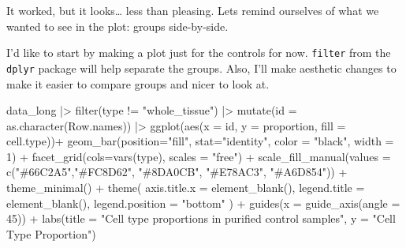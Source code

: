 \documentclass[
  letterpaper,
  DIV=11,
  numbers=noendperiod]{scrreprt}
\newenvironment{Shaded}{\begin{snugshade}}{\end{snugshade}}
\newcommand{\AttributeTok}[1]{\textcolor[rgb]{0.40,0.45,0.13}{#1}}
\newcommand{\DecValTok}[1]{\textcolor[rgb]{0.68,0.00,0.00}{#1}}
\newcommand{\FunctionTok}[1]{\textcolor[rgb]{0.28,0.35,0.67}{#1}}
\newcommand{\NormalTok}[1]{\textcolor[rgb]{0.00,0.23,0.31}{#1}}
\newcommand{\SpecialCharTok}[1]{\textcolor[rgb]{0.37,0.37,0.37}{#1}}
\newcommand{\StringTok}[1]{\textcolor[rgb]{0.13,0.47,0.30}{#1}}
\begin{document}
It worked, but it looks\ldots{} less than pleasing. Lets remind
ourselves of what we wanted to see in the plot: groups side-by-side.

I'd like to start by making a plot just for the controls for now.
\texttt{filter} from the \texttt{dplyr} package will help separate the
groups. Also, I'll make aesthetic changes to make it easier to compare
groups and nicer to look at.

\begin{Shaded}
\begin{Highlighting}[]
\NormalTok{data\_long }\SpecialCharTok{|\textgreater{}} 
  \FunctionTok{filter}\NormalTok{(type }\SpecialCharTok{!=} \StringTok{"whole\_tissue"}\NormalTok{) }\SpecialCharTok{|\textgreater{}} 
  \FunctionTok{mutate}\NormalTok{(}\AttributeTok{id =} \FunctionTok{as.character}\NormalTok{(Row.names)) }\SpecialCharTok{|\textgreater{}} 
  \FunctionTok{ggplot}\NormalTok{(}\FunctionTok{aes}\NormalTok{(}\AttributeTok{x =}\NormalTok{ id, }\AttributeTok{y =}\NormalTok{ proportion, }\AttributeTok{fill =}\NormalTok{ cell.type))}\SpecialCharTok{+}
  \FunctionTok{geom\_bar}\NormalTok{(}\AttributeTok{position=}\StringTok{"fill"}\NormalTok{, }\AttributeTok{stat=}\StringTok{"identity"}\NormalTok{, }\AttributeTok{color =} \StringTok{"black"}\NormalTok{, }\AttributeTok{width =} \DecValTok{1}\NormalTok{) }\SpecialCharTok{+}
  \FunctionTok{facet\_grid}\NormalTok{(}\AttributeTok{cols=}\FunctionTok{vars}\NormalTok{(type), }\AttributeTok{scales =} \StringTok{"free"}\NormalTok{) }\SpecialCharTok{+}
  \FunctionTok{scale\_fill\_manual}\NormalTok{(}\AttributeTok{values =} \FunctionTok{c}\NormalTok{(}\StringTok{"\#66C2A5"}\NormalTok{,}\StringTok{"\#FC8D62"}\NormalTok{, }\StringTok{"\#8DA0CB"}\NormalTok{, }\StringTok{"\#E78AC3"}\NormalTok{, }\StringTok{"\#A6D854"}\NormalTok{)) }\SpecialCharTok{+}
  \FunctionTok{theme\_minimal}\NormalTok{() }\SpecialCharTok{+}
  \FunctionTok{theme}\NormalTok{(}
    \AttributeTok{axis.title.x =} \FunctionTok{element\_blank}\NormalTok{(), }
    \AttributeTok{legend.title =} \FunctionTok{element\_blank}\NormalTok{(),}
    \AttributeTok{legend.position =} \StringTok{"bottom"}
\NormalTok{  ) }\SpecialCharTok{+}
  \FunctionTok{guides}\NormalTok{(}\AttributeTok{x =} \FunctionTok{guide\_axis}\NormalTok{(}\AttributeTok{angle =} \DecValTok{45}\NormalTok{)) }\SpecialCharTok{+}
  \FunctionTok{labs}\NormalTok{(}\AttributeTok{title =} \StringTok{"Cell type proportions in purified control samples"}\NormalTok{,}
       \AttributeTok{y =} \StringTok{"Cell Type Proportion"}\NormalTok{)}
\end{Highlighting}
\end{Shaded}
\end{document}
